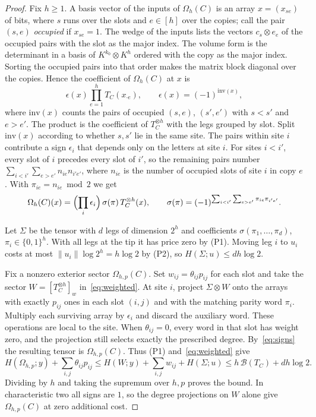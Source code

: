 \documentclass[11pt]{article}
\theoremstyle{remark}
\newcommand{\price}{\mathcal B}
\newcommand{\norm}[1]{\lVert #1\rVert}
\begin{document}
\begin{proof}
Fix \(h\ge1\). A basis vector of the inputs of \(\Omega_h(C)\) is an
array \(x=(x_{se})\) of bits, where \(s\) runs over the slots and
\(e\in[h]\) over the copies; call the pair \((s,e)\) \emph{occupied} if
\(x_{se}=1\). The wedge of the inputs lists the vectors
\(c_s\otimes e_e\) of the occupied pairs with the slot as the major
index. The volume form is the determinant in a basis of
\(K^{k_0}\otimes K^h\) ordered with the copy as the major index. Sorting
the occupied pairs into that order makes the matrix block diagonal over
the copies. Hence the coefficient of \(\Omega_h(C)\) at \(x\) is
\[
 \epsilon(x)\prod_{e=1}^h T_C(x_{\cdot e}),\qquad
 \epsilon(x)=(-1)^{\mathrm{inv}(x)},
\]
where \(\mathrm{inv}(x)\) counts the pairs of occupied \((s,e)\),
\((s',e')\) with \(s<s'\) and \(e>e'\). The product is the coefficient of
\(T_C^{\otimes h}\) with the legs grouped by slot. Split
\(\mathrm{inv}(x)\) according to whether \(s,s'\) lie in the same site.
The pairs within site \(i\) contribute a sign \(\epsilon_i\) that depends
only on the letters at site \(i\). For sites \(i<i'\), every slot of
\(i\) precedes every slot of \(i'\), so the remaining pairs number
\(\sum_{i<i'}\sum_{e>e'}n_{ie}n_{i'e'}\), where \(n_{ie}\) is the number
of occupied slots of site \(i\) in copy \(e\). With
\(\pi_{ie}=n_{ie}\bmod2\) we get
\begin{equation}\label{eq:signs}
 \Omega_h(C)(x)=\Bigl(\prod_i\epsilon_i\Bigr)\,\sigma(\pi)\,
   T_C^{\otimes h}(x),\qquad
 \sigma(\pi)=(-1)^{\sum_{i<i'}\sum_{e>e'}\pi_{ie}\pi_{i'e'}} .
\end{equation}

Let \(\Sigma\) be the tensor with \(d\) legs of dimension \(2^h\) and
coefficients \(\sigma(\pi_1,\ldots,\pi_d)\), \(\pi_i\in\{0,1\}^h\). With
all legs at the tip it has price zero by (P1). Moving leg \(i\) to
\(u_i\) costs at most \(\norm{u_i}\log2^h=h\log2\) by (P2), so
\(H(\Sigma;u)\le dh\log2\).

Fix a nonzero exterior sector \(\Omega_{h,p}(C)\). Set
\(w_{ij}=\theta_{ij}p_{ij}\) for each slot and take the sector
\(W=[T_C^{\otimes h}]_w\) in~\eqref{eq:weighted}. At site \(i\),
project \(\Sigma\otimes W\) onto the arrays with exactly \(p_{ij}\)
ones in each slot \((i,j)\) and with the matching parity word \(\pi_i\).
Multiply each surviving array by \(\epsilon_i\) and discard the auxiliary
word. These operations are local to the site. When \(\theta_{ij}=0\),
every word in that slot has weight zero, and the projection still selects
exactly the prescribed degree. By~\eqref{eq:signs} the resulting tensor
is \(\Omega_{h,p}(C)\). Thus (P1) and~\eqref{eq:weighted} give
\[
 H(\Omega_{h,p};y)+\sum_{i,j}\theta_{ij}p_{ij}
  \le H(W;y)+\sum_{i,j}w_{ij}+H(\Sigma;u)
  \le h\,\price(T_C)+dh\log2 .
\]
Dividing by \(h\) and taking the supremum over \(h,p\) proves the bound.
In characteristic two all signs are \(1\), so the degree projections on
\(W\) alone give \(\Omega_{h,p}(C)\) at zero additional cost.
\end{proof}
\end{document}
